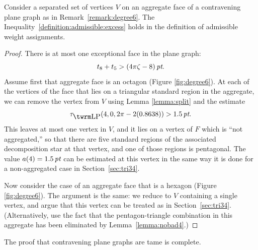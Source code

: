 \begin{lemma}
Consider a separated set of vertices $V$ on an aggregate face of a
contravening plane graph as in Remark~\ref{remark:degree6}.  The
Inequality~\ref{definition:admissible:excess} holds in the
definition of admissible weight assignments.
\end{lemma}

\begin{proof}
There is at most one exceptional face in the plane graph:
    $$t_8 + t_5 > (4\pi\zeta-8)\,\hbox{\it pt}.$$
Assume first that aggregate face is an octagon (Figure
\ref{fig:degree6}). At each of the vertices of the face that lies
on a triangular standard region in the aggregate, we can remove
the vertex from $V$ using Lemma \ref {lemma:split} and the
estimate
    $$\tauLP(4,0,2\pi-2 (0.8638)) > 1.5\,\pt.$$
This leaves at most one vertex in $V$, and it lies on a vertex of
$F$ which is ``not aggregated,'' so that there are five standard
regions of the associated decomposition star at that vertex, and
one of those regions is pentagonal.  The value $a(4)=1.5\,\hbox{\it pt}$ can
be estimated at this vertex in the same way it is done for a
non-aggregated case in Section~\ref{sec:tri34}.

Now consider the case of an aggregate face that is a hexagon
(Figure \ref{fig:degree6}).  The argument is the same: we reduce
to $V$ containing a single vertex, and argue that this vertex can
be treated as in Section~\ref{sec:tri34}.  (Alternatively, use the
fact that the pentagon-triangle combination in this aggregate has
been eliminated by Lemma~\ref{lemma:nobad4}.)
\end{proof}






The proof that contravening plane graphs are tame is complete.
